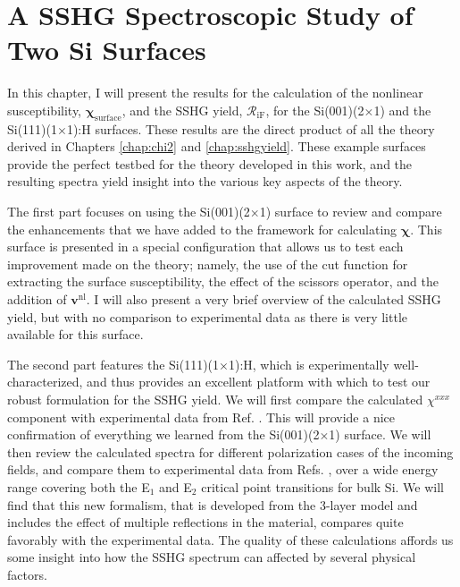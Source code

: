\chapter{A SSHG Spectroscopic Study of Two Si Surfaces}\label{chap:results}
\partialtoc

In this chapter, I will present the results for the calculation of the nonlinear
susceptibility, $\boldsymbol{\chi}_{\mathrm{surface}}$, and the SSHG yield,
$\mathcal{R}_{\mathrm{iF}}$, for the Si(001)(2$\times$1) and the
Si(111)(1$\times$1):H surfaces. These results are the direct product of all the
theory derived in Chapters \ref{chap:chi2} and \ref{chap:sshgyield}. These
example surfaces provide the perfect testbed for the theory developed in this
work, and the resulting spectra yield insight into the various key aspects of
the theory.

The first part focuses on using the Si(001)(2$\times$1) surface to review and
compare the enhancements that we have added to the framework for calculating
$\boldsymbol{\chi}$. This surface is presented in a special configuration that
allows us to test each improvement made on the theory; namely, the use of the
cut function for extracting the surface susceptibility, the effect of the
scissors operator, and the addition of $\mathbf{v}^{\mathrm{nl}}$. I will also
present a very brief overview of the calculated SSHG yield, but with no
comparison to experimental data as there is very little available for this
surface.

The second part features the Si(111)(1$\times$1):H, which is experimentally
well-characterized, and thus provides an excellent platform with which to test
our robust formulation for the SSHG yield. We will first compare the calculated
$\chi^{xxx}$ component with experimental data from Ref. \cite{hoferAPA96}. This
will provide a nice confirmation of everything we learned from the
Si(001)(2$\times$1) surface. We will then review the calculated spectra for
different polarization cases of the incoming fields, and compare them to
experimental data from Refs. \cite{bergfeldPRL04, mejiaPRB02, mitchellSS01},
over a wide energy range covering both the E$_{1}$ and E$_{2}$ critical point
transitions for bulk Si. We will find that this new formalism, that is developed
from the 3-layer model and includes the effect of multiple reflections in the
material, compares quite favorably with the experimental data. The quality of
these calculations affords us some insight into how the SSHG spectrum can
affected by several physical factors.


